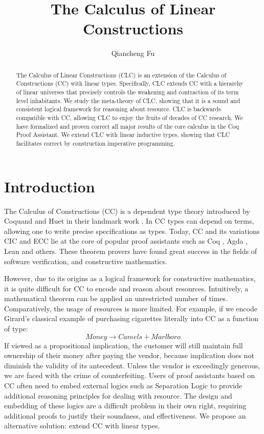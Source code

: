 \documentclass[sigplan,screen]{acmart}
\title{The Calculus of Linear Constructions}
\author{Qiancheng Fu}
\affiliation{
  \institution{Boston University}
  \city{Boston}
  \state{MA}
  \country{USA}
}
\theoremstyle{definition}
\begin{document}
  \begin{abstract}
    The Calculus of Linear Constructions (CLC) is an extension of the Calculus of Constructions (CC) with linear types. Specifically, CLC extends CC with a hierarchy of linear universes that precisely controls the weakening and contraction of its term level inhabitants. We study the meta-theory of CLC, showing that it is a sound and consistent logical framework for reasoning about resource. CLC is backwards compatible with CC, allowing CLC to enjoy the fruits of decades of CC research. We have formalized and proven correct all major results of the core calculus in the Coq Proof Assistant. We extend CLC with linear inductive types, showing that CLC facilitates correct by construction imperative programming.
  \end{abstract}
  \maketitle 

  \section{Introduction}
  The Calculus of Constructions (CC) is a dependent type theory introduced by Coquand and Huet in their landmark work \cite{cc}. In CC types can depend on terms, allowing one to write precise specifications as types. Today, CC and its variations CIC \cite{cic} and ECC \cite{ecc} lie at the core of popular proof assistants such as Coq \cite{coq}, Agda \cite{agda}, Lean \cite{lean} and others. These theorem provers have found great success in the fields of software verification, and constructive mathematics. 
  
  However, due to its origins as a logical framework for constructive mathematics, it is quite difficult for CC to encode and reason about resources. Intuitively, a mathematical theorem can be applied an unrestricted number of times. Comparatively, the usage of resources is more limited. For example, if we encode Girard's classical example \cite{girard95} of purchasing cigarettes literally into CC as a function of type:
  \begin{equation*}
    Money \rightarrow Camels + Marlboro
  \end{equation*}
  If viewed as a propositional implication, the customer will still maintain full ownership of their money after paying the vendor, because implication does not diminish the validity of its antecedent. Unless the vendor is exceedingly generous, we are faced with the crime of counterfeiting. Users of proof assistants based on CC often need to embed external logics such as Separation Logic to provide additional reasoning principles for dealing with resource. The design and embedding of these logics are a difficult problem in their own right, requiring additional proofs to justify their soundness, and effectiveness. We propose an alternative solution: extend CC with linear types.
  
\end{document}
